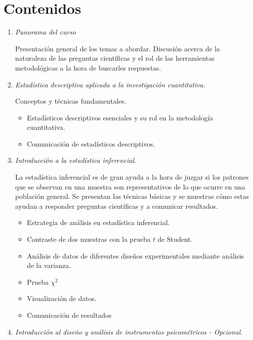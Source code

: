 \documentclass[letterpaper,11pt]{article}
\begin{document}
\section{Contenidos}

\begin{enumerate}
  \item \emph{Panorama del curso}
  
  Presentaci\'on general de los temas a abordar. Discusi\'on acerca de la naturaleza de las preguntas cient\'ificas y el rol de las herramientas metodol\'ogicas a la hora de buscarles respuestas. 
  
  \item \emph{Estad\'istica descriptiva aplicada a la investigaci\'on cuantitativa}.\label{it:desc}
  
Conceptos y t\'ecnicas fundamentales.
  
  \begin{itemize}
    \item Estad\'isticos descriptivos esenciales y su rol en la metodolog\'ia cuantitativa.
    \item Comunicaci\'on de estad\'isticos descriptivos.
  \end{itemize}

  \item \emph{Introducci\'on a la estad\'istica inferencial}.\label{it:inf}
  
La estad\'istica inferencial es de gran ayuda a la hora de juzgar si los patrones que se observan en una muestra son representativos de lo que ocurre en una poblaci\'on general. Se presentan las t\'ecnicas b\'asicas y se muestras c\'omo estas ayudan a responder preguntas cient\'ificas y a comunicar resultados.

  \begin{itemize}
    \item Estrategia de an\'alisis en estad\'istica inferencial.
    \item Contraste de dos muestras con la prueba $t$ de Student.
    \item An\'alisis de datos de diferentes dise\~nos experimentales mediante an\'alisis de la varianza.
    \item Prueba $\chi^2$
    \item Visualizaci\'on de datos.
    \item Comunicaci\'on de resultados
  \end{itemize}
  
  \item \emph{Introducci\'on al dise\~no y an\'alisis de instrumentos psicom\'etricos - Opcional}.\label{it:psic}
  

\end{enumerate}
\end{document}

